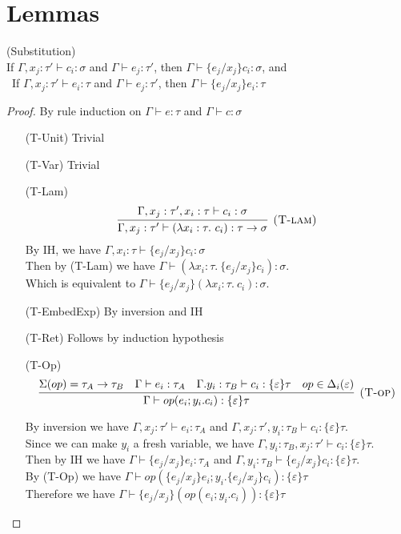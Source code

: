 \section{Lemmas}
\begin{lemma} (Substitution) \\
If $\Gamma, x_j : \tau' \vdash c_i : \sigma$ and $\Gamma \vdash e_j : \tau'$, then $\Gamma \vdash \{e_j/x_j\}c_i : \sigma$, and\\\
If $\Gamma, x_j : \tau' \vdash e_i : \tau $ and $\Gamma \vdash e_j : \tau'$, then $\Gamma \vdash \{e_j/x_j\}e_i : \tau$

\begin{proof}
By rule induction on $\Gamma \vdash e : \tau$ and $\Gamma \vdash c : \sigma$
\begin{enumerate}[align=left]
\item[(T-Unit)] Trivial
\item[(T-Var)] Trivial
\item[(T-Lam)] 
$$
\infer[\textsc{(T-lam)}]
  {\Gamma, x_j : \tau'  \vdash (\lambda x_i: \tau.\ c_i) : \tau \rightarrow \sigma}
  {\Gamma,x_j : \tau',  x_i:\tau \vdash c_i : \sigma} 
$$
By IH, we have $\Gamma, x_i:\tau \vdash \{e_j/x_j\}c_i : \sigma$\\
Then by (T-Lam) we have $\Gamma \vdash (\lambda x_i : \tau.\ \{e_j/x_j\}c_i) : \sigma$.\\
Which is equivalent to $\Gamma \vdash \{e_j/x_j\}(\lambda x_i : \tau.\ c_i) : \sigma$.
\item[(T-EmbedExp)] By inversion and IH
\item[(T-Ret)] Follows by induction hypothesis
\item[(T-Op)]  
$$
\infer[\textsc{(T-op)}]
  {\Gamma\vdash op(e_i; y_i.c_i) : \{\varepsilon\}\tau }
  {\Sigma(op) = \tau_A \rightarrow \tau_B & \Gamma \vdash e_i : \tau_A & \Gamma. y_i:\tau_B\vdash c_i: \{\varepsilon\}\tau & op \in \Delta_i(\varepsilon)} 
$$

By inversion we have $\Gamma, x_j : \tau' \vdash e_i : \tau_A$ and $\Gamma, x_j : \tau', y_i : \tau_B \vdash c_i : \{\varepsilon\} \tau$. \\
Since we can make $y_i$ a fresh variable, we have $\Gamma,  y_i : \tau_B, x_j:\tau' \vdash c_i : \{\varepsilon\} \tau$.\\
Then by IH we have $\Gamma \vdash \{e_j/x_j\}e_i : \tau_A$ and $\Gamma,  y_i : \tau_B \vdash \{e_j/x_j\}c_i : \{\varepsilon\} \tau$.\\
By (T-Op) we have $\Gamma \vdash op(\{e_j/x_j\}e_i; y_i.\{e_j/x_j\}c_i) : \{\varepsilon\}\tau$\\
Therefore we have $\Gamma \vdash \{e_j/x_j\}(op(e_i; y_i.c_i)) : \{\varepsilon\}\tau$


\end{enumerate}
\end{proof}
\end{lemma}
